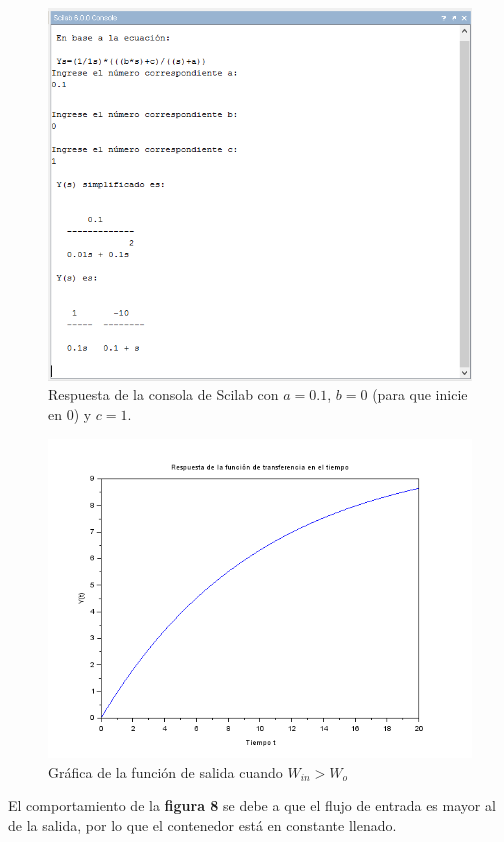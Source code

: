 \documentclass[letterpaper]{article}
\begin{document}
	\begin{figure}[h]
		\centering
		\includegraphics[scale=.6]{cod2}
		\caption{Respuesta de la consola de Scilab con $ a=0.1 $, $ b=0 $ (para que inicie en $ 0 $) y $ c=1 $.}
	\end{figure}
	\begin{figure}[h]
		\centering
		\includegraphics[scale=.7]{gra3}
		\caption{Gráfica de la función de salida cuando $ W_{in}>W_o $}
	\end{figure}
	\FloatBarrier
	El comportamiento de la \textbf{figura 8} se debe a que el flujo de entrada es mayor al de la salida, por lo que el contenedor está en constante llenado.\\\\	
\end{document}

